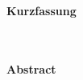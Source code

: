 {\Huge{\textbf{Kurzfassung}}} 
~\\ \\
\blindtext

~\\

{\Huge{\textbf{Abstract}}} 
~\\ \\
\blindtext

